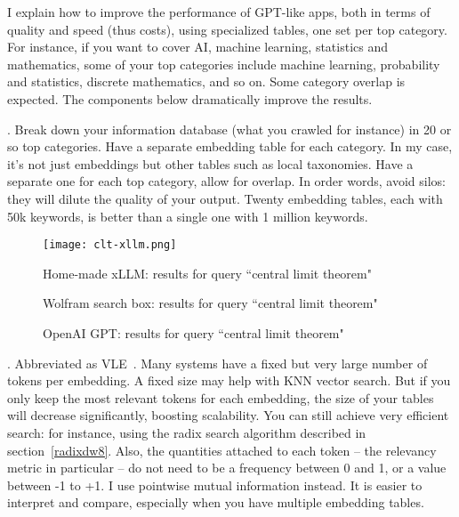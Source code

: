 \documentclass[oneside,10pt]{book}
\begin{document}
I explain how to improve the performance of GPT-like apps, both in terms of quality and speed (thus costs), using specialized tables, one set per top category. 
 For instance, if you want to cover AI, machine learning, statistics and mathematics, some of your top categories include machine learning, probability and statistics, discrete mathematics, and so on. Some category overlap is expected. The components below dramatically improve the results.   

\vspace{1ex}
. Break down your information database (what you crawled for instance) in 20 or so top categories. Have a separate embedding table for each category. In my case, it’s not just embeddings but other tables such as local taxonomies. Have a separate one for each top category, allow for overlap. In order words, avoid silos: they will dilute the quality of your output. Twenty embedding tables, each with 50k keywords, is better than a single one with 1 million keywords.


\begin{figure}[H]
\centering
\texttt{[image: clt-xllm.png]}  
\caption{Home-made xLLM: results for query ``central limit theorem"}
\label{fig:log10trmt}
\end{figure}

\begin{figure}[H]
\centering
{}  
\caption{Wolfram search box: results for query ``central limit theorem"}
\label{fig:log109mt}
\end{figure}

\begin{figure}[H]
\centering
{}  
\caption{OpenAI GPT: results for query ``central limit theorem"}
\label{fig:log109mt65}
\end{figure}

\vspace{1ex}
. Abbreviated as \textcolor{index}{VLE}~\cite{vle23}. Many systems have a fixed but very large number of tokens per embedding. 
A fixed size may help with \textcolor{index}{KNN vector search}. But if you only keep the most relevant tokens for each embedding, the size of your tables will decrease
 significantly, boosting scalability. You can still achieve very efficient search: for instance, using the \textcolor{index}{radix search} algorithm described in section~\ref{radixdw8}. 
 Also, the quantities attached to each token -- the relevancy metric in particular -- do not need to be a frequency  between 0 and 1, or a value between -1 to +1. 
 I use \textcolor{index}{pointwise mutual information} instead. It is easier to interpret and compare, especially when you have multiple embedding tables.
\end{document}
